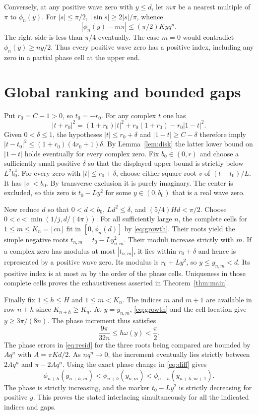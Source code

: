 \documentclass[11pt]{article}
\begin{document}
Conversely, at any positive wave zero with $y\le d$, let $m\pi$
be a nearest multiple of $\pi$ to $\phi_n(y)$. For
$|s|\le\pi/2$, $|\sin s|\ge2|s|/\pi$, whence
\begin{equation}\label{eq:resid}
 |\phi_n(y)-m\pi|\le(\pi/2)K y q^n.
\end{equation}
The right side is less than $\pi/4$ eventually. The case $m=0$
would contradict $\phi_n(y)\ge ny/2$. Thus every positive wave
zero has a positive index, including any zero in a partial
phase cell at the upper end.

\section{Global ranking and bounded gaps}

Put $r_0=C-1>0$, so $t_0=-r_0$. For any complex $t$ one has
\begin{equation}\label{eq:tangent}
 |t+r_0|^2=(1+r_0)|t|^2+r_0(1+r_0)-r_0|1-t|^2 .
\end{equation}
Given $0<\delta\le1$, the hypotheses
$|t|\le r_0+\delta$ and $|1-t|\ge C-\delta$ therefore imply
$|t-t_0|^2\le(1+r_0)(4r_0+1)\delta$.
By Lemma~\ref{lem:disk} the latter lower bound on $|1-t|$ holds
eventually for every complex zero. Fix $b_0\in(0,r)$ and choose
a sufficiently small positive $\delta$ so that the displayed
upper bound is strictly below $L^2 b_0^4$. For every zero
with $|t|\le r_0+\delta$, choose either square root
$v$ of $(t-t_0)/L$. It has $|v|<b_0$. By transverse exclusion it is
purely imaginary. The center is excluded, so this zero is
$t_0-Ly^2$ for some $y\in(0,b_0)$ that is a real wave zero.

Now reduce $d$ so that $0<d<b_0$, $Ld^2\le\delta$, and
$(5/4)Hd<\pi/2$. Choose
$0<c<\min(1/j,d/(4\pi))$. For all sufficiently large $n$,
the complete cells for $1\le m\le K_n=\lfloor cn\rfloor$
fit in $[0,\phi_n(d)]$ by \eqref{eq:growth}. Their roots yield the
simple negative roots $t_{n,m}=t_0-Ly_{n,m}^2$. Their moduli increase
strictly with $m$. If a complex zero has modulus at most
$|t_{n,m}|$, it lies within $r_0+\delta$ and hence is represented
by a positive wave zero. Its modulus is $r_0+Ly^2$, so
$y\le y_{n,m}<d$. Its positive index is at most $m$ by the
order of the phase cells. Uniqueness in those complete cells
proves the exhaustiveness asserted in Theorem~\ref{thm:main}.

Finally fix $1\le h\le H$ and $1\le m<K_n$. The indices $m$ and
$m+1$ are available in row $n+h$ since $K_{n+h}\ge K_n$.
At $y=y_{n,m}$, \eqref{eq:growth} and the cell location give
$y\ge 3\pi/(8n)$. The phase increment thus satisfies
\[
 \frac{9\pi}{32n}\le h\omega(y)<\frac{\pi}{2}.
\]
The phase errors in \eqref{eq:resid} for the three roots being
compared are bounded by $Aq^n$ with $A=\pi Kd/2$.
As $nq^n\to0$, the increment eventually lies strictly between
$2Aq^n$ and $\pi-2Aq^n$. Using the exact phase change in
\eqref{eq:diff} gives
\[
 \phi_{n+h}(y_{n+h,m})<\phi_{n+h}(y_{n,m})
 <\phi_{n+h}(y_{n+h,m+1}).
\]
The phase is strictly increasing, and the marker $t_0-Ly^2$
is strictly decreasing for positive $y$. This proves the stated
interlacing simultaneously for all the indicated indices and gaps.
\end{document}
